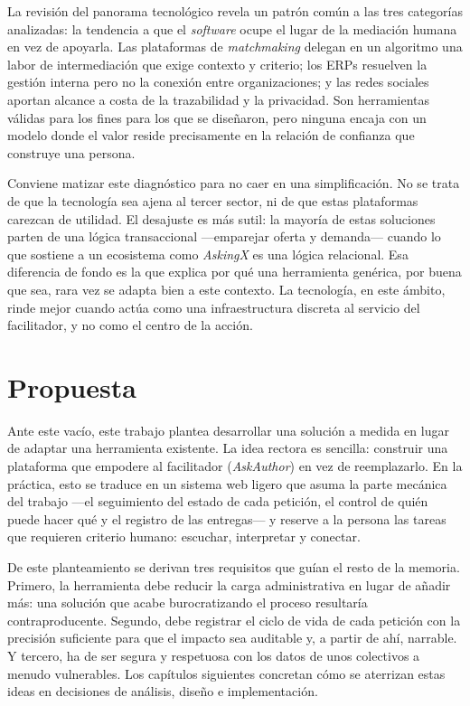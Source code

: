 \documentclass[11pt,oneside,spanish,listoffigures,listoftables]{tfgetsinf}
\begin{document}
La revisión del panorama tecnológico revela un patrón común a las tres categorías analizadas: la tendencia a que el \textit{software} ocupe el lugar de la mediación humana en vez de apoyarla. Las plataformas de \textit{matchmaking} delegan en un algoritmo una labor de intermediación que exige contexto y criterio; los ERPs resuelven la gestión interna pero no la conexión entre organizaciones; y las redes sociales aportan alcance a costa de la trazabilidad y la privacidad. Son herramientas válidas para los fines para los que se diseñaron, pero ninguna encaja con un modelo donde el valor reside precisamente en la relación de confianza que construye una persona.

Conviene matizar este diagnóstico para no caer en una simplificación. No se trata de que la tecnología sea ajena al tercer sector, ni de que estas plataformas carezcan de utilidad. El desajuste es más sutil: la mayoría de estas soluciones parten de una lógica transaccional —emparejar oferta y demanda— cuando lo que sostiene a un ecosistema como \textit{AskingX} es una lógica relacional. Esa diferencia de fondo es la que explica por qué una herramienta genérica, por buena que sea, rara vez se adapta bien a este contexto. La tecnología, en este ámbito, rinde mejor cuando actúa como una infraestructura discreta al servicio del facilitador, y no como el centro de la acción.

\section{Propuesta}

Ante este vacío, este trabajo plantea desarrollar una solución a medida en lugar de adaptar una herramienta existente. La idea rectora es sencilla: construir una plataforma que empodere al facilitador (\textit{AskAuthor}) en vez de reemplazarlo. En la práctica, esto se traduce en un sistema web ligero que asuma la parte mecánica del trabajo —el seguimiento del estado de cada petición, el control de quién puede hacer qué y el registro de las entregas— y reserve a la persona las tareas que requieren criterio humano: escuchar, interpretar y conectar.

De este planteamiento se derivan tres requisitos que guían el resto de la memoria. Primero, la herramienta debe reducir la carga administrativa en lugar de añadir más: una solución que acabe burocratizando el proceso resultaría contraproducente. Segundo, debe registrar el ciclo de vida de cada petición con la precisión suficiente para que el impacto sea auditable y, a partir de ahí, narrable. Y tercero, ha de ser segura y respetuosa con los datos de unos colectivos a menudo vulnerables. Los capítulos siguientes concretan cómo se aterrizan estas ideas en decisiones de análisis, diseño e implementación.
\end{document}
